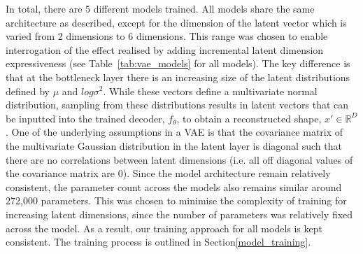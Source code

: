 \documentclass{article}
\begin{document}
In total, there are 5 different models trained. All models share the same architecture as described, except for the dimension of the latent vector which is varied from 2 dimensions to 6 dimensions. This range was chosen to enable interrogation of the effect realised by adding incremental latent dimension expressiveness (see Table~\ref{tab:vae_models} for all models). The key difference is that at the bottleneck layer there is an increasing size of the latent distributions defined by $\mu$ and $log\sigma^2$. While these vectors define a multivariate normal distribution, sampling from these distributions results in latent vectors that can be inputted into the trained decoder, $f_\theta$, to obtain a reconstructed shape, $x'\in \mathbb{R}^D$. One of the underlying assumptions in a VAE is that the covariance matrix of the multivariate Gaussian distribution in the latent layer is diagonal such that there are no correlations between latent dimensions (i.e. all off diagonal values of the covariance matrix are 0). Since the model architecture remain relatively consistent, the parameter count across the models also remains similar around 272,000 parameters. This was chosen to minimise the complexity of training for increasing latent dimensions, since the number of parameters was relatively fixed across the model. As a result, our training approach for all models is kept consistent. The training process is outlined in Section\ref{model_training}.
\end{document}
